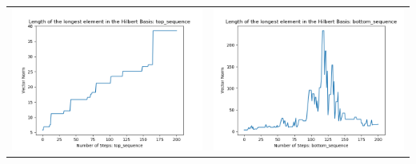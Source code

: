 \documentclass[10pt]{article}
\begin{document}
\begin{tabular}{c|c}
\begin{minipage}{.45\textwidth}
\includegraphics[width=\textwidth]{"DATA/5d/5 generators 2 bound I/top_sequence LENGTH"}
\end{minipage} &
\begin{minipage}{.45\textwidth}
\includegraphics[width=\textwidth]{"DATA/5d/5 generators 2 bound I bottomup/bottom_sequence LENGTH"}
\end{minipage}
\end{tabular}
\end{document}
